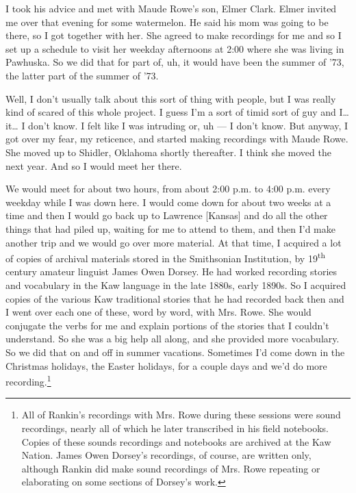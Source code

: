 \documentclass[output=paper]{LSP/langsci}
\begin{document}
I took his advice and met with Maude Rowe's son, Elmer Clark. Elmer invited me over that evening for some watermelon. He said his mom was going to be there, so I got together with her. She agreed to make recordings for me and so I set up a schedule to visit her weekday afternoons at 2:00 where she was living in Pawhuska. So we did that for part of, uh, it would have been the summer of '73, the latter part of the summer of '73. 

Well, I don't usually talk about this sort of thing with people, but I was really kind of scared of this whole project. I guess I'm a sort of timid sort of guy and I{\ldots} it{\ldots} I don't know. I felt like I was intruding or, uh --- I don't know. But anyway, I got over my fear, my reticence, and started making recordings with Maude Rowe. She moved up to Shidler, Oklahoma shortly thereafter. I think she moved the next year. And so I would meet her there. 

We would meet for about two hours, from about 2:00 p.m. to 4:00 p.m. every weekday while I was down here. I would come down for about two weeks at a time and then I would go back up to Lawrence [Kansas] and do all the other things that had piled up, waiting for me to attend to them, and then I'd make another trip and we would go over more material. At that time, I acquired a lot of copies of archival materials stored in the Smithsonian Institution, by 19\textsuperscript{th} century amateur linguist James Owen Dorsey. He had worked recording stories and vocabulary in the Kaw language in the late 1880s, early 1890s. So I acquired copies of the various Kaw traditional stories that he had recorded back then and I went over each one of these, word by word, with Mrs. Rowe. She would conjugate the verbs for me and explain portions of the stories that I couldn't understand. So she was a big help all along, and she provided more vocabulary. So we did that on and off in summer vacations. Sometimes I'd come down in the Christmas holidays, the Easter holidays, for a couple days and we'd do more recording.\footnote{All of Rankin's recordings with Mrs. Rowe during these sessions were sound recordings, nearly all of which he later transcribed in his field notebooks. Copies of these sounds recordings and notebooks are archived at the Kaw Nation. James Owen Dorsey's recordings, of course, are written only, although Rankin did make sound recordings of Mrs. Rowe repeating or elaborating on some sections of Dorsey's work.}
\end{document}
